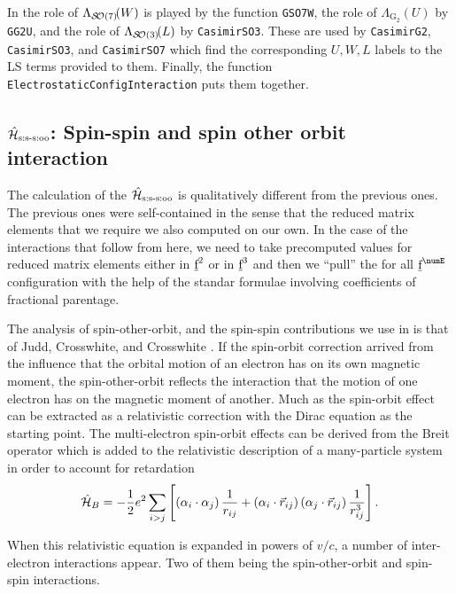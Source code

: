 \documentclass{article}
\newcommand{\codetext}[1]{{\color{BlueViolet} \texttt{#1}}}
\begin{document}
In \qlanth the role of $\Lambda_{\mathcal{S\!O}(7)}\!(W)$ is played by the function \codetext{GSO7W}, the role of $\Lambda_{\text{G}_2}\!(U)$ by \codetext{GG2U}, and the role of  $\Lambda_{\mathcal{S\!O}(3)}\!(L)$ by \codetext{CasimirSO3}. These are used by \codetext{CasimirG2}, \codetext{CasimirSO3}, and \codetext{CasimirSO7} which find the corresponding ${U,W,L}$ labels to the LS terms provided to them. Finally, the function \codetext{ElectrostaticConfigInteraction} puts them together.

\subsection{$\hat{\mathcal{H}}_{\text{s:s-s:oo}}$: Spin-spin and spin other orbit interaction}

The calculation of the $\hat{\mathcal{H}}_{\text{s:s-s:oo}}$ is qualitatively different from the previous ones. The previous ones were self-contained in the sense that the reduced matrix elements that we require we also computed on our own. In the case of the interactions that follow from here, we need to take precomputed values for reduced matrix elements either in $\underbar{$\text{f}$}^2$ or in $\underbar{$\text{f}$}^3$ and then we ``pull'' the for all $\forb^{\numE}$ configuration with the help of the standar formulae involving coefficients of fractional parentage.

The analysis of spin-other-orbit, and the spin-spin contributions we use in \qlanth is that of Judd, Crosswhite, and Crosswhite \cite{judd_intra-atomic_1968}. If the spin-orbit correction arrived from the influence that the orbital motion of an electron has on its own magnetic moment, the spin-other-orbit reflects the interaction that the motion of one electron has on the magnetic moment of another. Much as the spin-orbit effect can be extracted as a relativistic correction with the Dirac equation as the starting point. The multi-electron spin-orbit effects can be derived from the Breit operator \cite{bethe_quantum_1957} which is added to the relativistic description of a many-particle system in order to account for retardation
\begin{equation}
\hat{\mathcal{H}}_B = -\frac{1}{2}e^2 \sum_{i>j} \left[ \left(\alpha_i\cdot\alpha_j\right)\frac{1}{r_{ij}} + \left(\alpha_i\cdot{\vec{r}_{ij}}\right)\left(\alpha_j\cdot\vec{r}_{ij}\right) \frac{1}{r_{ij}^3} \right].
\end{equation}

When this relativistic equation is expanded in powers of $v/c$, a number of inter-electron interactions appear. Two of them being the spin-other-orbit and spin-spin interactions.
\end{document}
